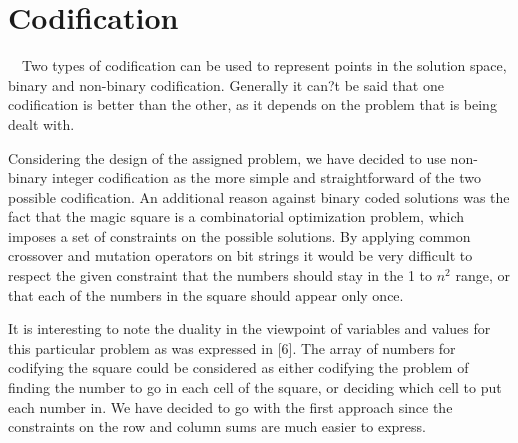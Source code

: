 \section[Codification]{\label{identificadorReferenciaCruzada}
Codification}

\ \ Two types of codification can be used to represent points in the solution space, binary and non-binary codification. Generally it can?t be said that one codification is better than the other, as it depends on the problem that is being dealt with.

Considering the design of the assigned problem, we have decided to use non- binary integer codification as the more simple and straightforward of the two possible codification. An additional reason against binary coded solutions was the fact that the magic square is a combinatorial optimization problem, which imposes a set of constraints on the possible solutions. By applying common crossover and mutation operators on bit strings it would be very difficult to respect the given constraint that the numbers should stay in the 1 to $n^2$ range, or that each of the numbers in the square should appear only once.

It is interesting to note the duality in the viewpoint of variables and values for this particular problem as was expressed in [6]. The array of numbers for codifying the square could be considered as either codifying the problem of finding the number to go in each cell of the square, or deciding which cell to put each number in. We have decided to go with the first approach since the constraints on the row and column sums are much easier to express.


